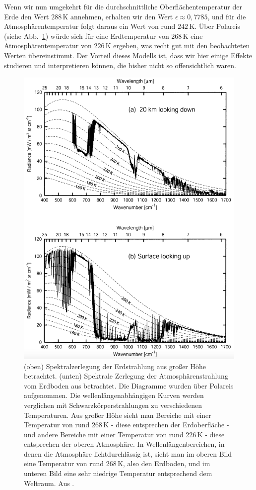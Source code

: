 Wenn wir nun umgekehrt f\"ur die durchschnittliche Oberfl\"achentemperatur der Erde den Wert $288$\,K
annehmen, erhalten wir den Wert $\epsilon \approx 0,7785$, und f\"ur die Atmosph\"arentemperatur
folgt daraus ein Wert von rund $242$\,K. \"Uber Polareis (siehe Abb.\ \ref{fig_updown}) w\"urde sich f\"ur
eine Erdtemperatur von $268$\,K eine Atmosph\"arentemperatur von $226$\,K ergeben, was recht gut
mit den beobachteten Werten \"ubereinstimmt. Der Vorteil dieses Modells
ist, dass wir hier einige Effekte studieren und interpretieren k\"onnen, die bisher nicht so
offensichtlich waren.

\begin{figure}
\includegraphics[scale = 0.4]{./Bilder_Klima/Petty.png}
\caption{\label{fig_updown}%
(oben) Spektralzerlegung der Erdstrahlung aus gro\ss er H\"ohe betrachtet.
(unten) Spektrale Zerlegung der Atmosph\"arenstrahlung vom Erdboden aus
betrachtet. Die Diagramme wurden \"uber Polareis aufgenommen. 
Die wellenl\"angenabh\"angigen Kurven werden verglichen mit
Schwarzk\"orperstrahlungen zu verschiedenen Temperaturen. Aus gro\ss er H\"ohe
sieht man Bereiche mit einer Temperatur von rund 268\,K - diese entsprechen
der Erdoberfl\"ache - und andere Bereiche mit einer Temperatur von rund 226\,K - 
diese entsprechen der oberen Atmosph\"are. In Wellenl\"angenbereichen, in denen
die Atmosph\"are lichtdurchl\"assig ist, sieht man im oberen Bild eine Temperatur von rund
268\,K, also den Erdboden, und im unteren Bild eine sehr niedrige Temperatur entsprechend
dem Weltraum. Aus \cite{Petty}.}  
\end{figure}

